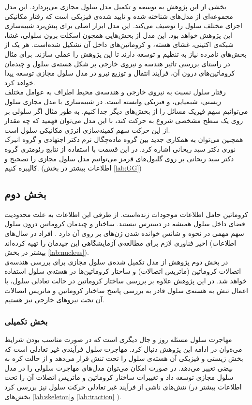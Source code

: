 بخشی از این پژوهش به توسعه و تکمیل مدل سلول مجازی می‌پردازد. این مدل مجموعه‌ای از مدل‌های شناخته شده و تایید شده‌ی فیزیکی است که رفتار مکانیکی اجزای مختلف سلول را توصیف می‌کند. این مدل ابزار اصلی برای پیش‌برد شبیه‌سازی این پژوهش خواهد بود. این مدل از بخش‌هایی همچون اسکلت برون سلولی، غشا، شبکه‌ی اکتینی، غشای هسته، و کروماتین‌های داخل آن تشکیل شده‌است. هر یک از بخش‌‌های نامرده نیاز به تنظیم و توسعه دارند تا این پژوهش را عملی سازند. برای مثال در راستای بررسی تاثیر هندسه و نیروی خارجی بر شکل هسته‌ی سلول و چیدمان کروماتین‌های درون آن، فرآیند انتقال و توزیع نیرو در مدل سلول مجازی توسعه پیدا خواهد کرد. \\


رفتار سلول نسبت به نیروی خارجی و هندسه‌ی محیط اطراف به عوامل مختلف زیستی، شیمیایی، و فیزیکی وابسته است. در شبیه‌سازی با مدل مجازی سلول می‌توانیم سهم فیریک مسائل را از بخش‌های دیگر جدا کنیم. به طور مثال اگر سلولی بر روی یک سطح مشخصی شروع به حرکت کند، با این مدل می‌توان فهمید که چه مقدار از این حرکت سهم کمینه‌سازی انرژی مکانیکی سلول است. \\


همچنین می‌توان به همکاری جدید بین گروه‌ ماده‌چگال نرم دکتر اجتهادی و گروه انبرک نوری دکتر سید ریحانی اشاره کرد. در این قسمت با استفاده از نتایج رئومتری گروه دکتر سید ریحانی بر روی گلبول‌های قرمز می‌توانیم مدل سلول مجازی را تصحیح و کالیبره کنیم. (اطلاعات بیشتر در بخش \ref{lab:GG})
\subsection{بخش دوم}
کروماتین حامل اطلاعات موجودات زنده‌است. از طرفی این اطلاعات به علت محدودیت فضای داخل سلول همیشه در دسترس نیستند. ساختار و چیدمان کروماتین درون سلول سهم مهمی در نحوه و شانس خوانده شدن ژن‌های بر روی آن دارد . افراد در سال‌های اخیر فناوری لازم برای مطالعه‌ی آزمایشگاهی این چیدمان را تهیه کرده‌اند (اطلاعات بیشتر در بخش \ref{lab:nucleus}). \\

در بخش دوم پژوهش از مدل تکمیل شده‌ی سلول مجازی برای بررسی هندسه‌ی اتصالات کروماتین (ماتریس اتصالات) و ساختار کروماتین‌ها در هسته‌ی سلول استفاده خواهد شد. در این پژوهش علاوه بر بررسی ساختار کروماتین‌ در حالت تعادلی سلول، با اعمال تنش به هسته‌ی سلول قادر به  بررسی پاسخ ساختار کروماتین و ماتریس اتصالات آن تحت نیرو‌های خارجی نیز هستیم.

\subsubsection{بخش تکمیلی}
مهاجرت سلول مسئله روز و جال دیگری است که در صورت مناسب بودن شرایط می‌ةوان در ادامه این پژوهش دنبال کرد. مهاجرت سلول فرآیندی غیر تعادلی است که بخش زیستی و فیزیکی آن هسته‌ی سلول را تحت تنش قرار می‌دهد و از حالت کره به بیضی تغییر می‌دهد. در صورت امکان می‌توان مدل‌های مهاجرت سلولی را در مدل سلول مجازی توسعه داد و تغییرات ساختار کروماتین و ماتریس اتصلات آن را تحت تنش‌های ناشی از فرآیند غیر تعادلی حرکت سلول نیز بررسی کرد (اطلاعات بیشتر در بخش‌های \ref{lab:skeleton}و \ref{lab:traction}  ).

